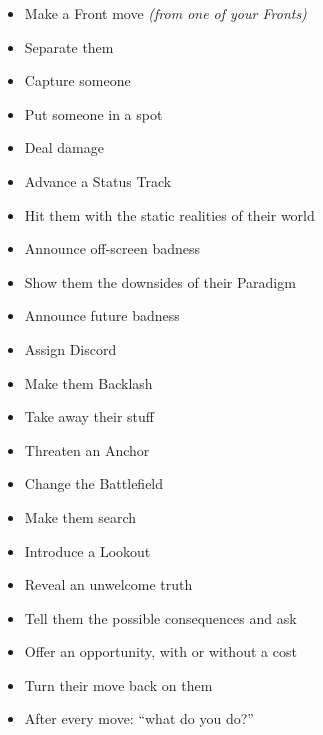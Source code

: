 \documentclass[letterpaper,10pt]{article}
\newcommand{\SECTION}[1]{\vspace{.5em}{\noindent\titlefont\LARGE\textbf{#1}}

}
\begin{document}
\SECTION{Your Moves}
\begin{itemize}
\item Make a Front move \textit{(from one of your Fronts)}
\item Separate them
\item Capture someone
\item Put someone in a spot
\item Deal damage
\item Advance a Status Track
\item Hit them with the static realities of their world
\item Announce off-screen badness
\item Show them the downsides of their Paradigm
\item Announce future badness
\item Assign Discord
\item Make them Backlash
\item Take away their stuff
\item Threaten an Anchor
\item Change the Battlefield
\item Make them search
\item Introduce a Lookout
\item Reveal an unwelcome truth
\item Tell them the possible consequences and ask
\item Offer an opportunity, with or without a cost
\item Turn their move back on them
\item After every move: ``what do you do?''
\end{itemize}
\end{document}
